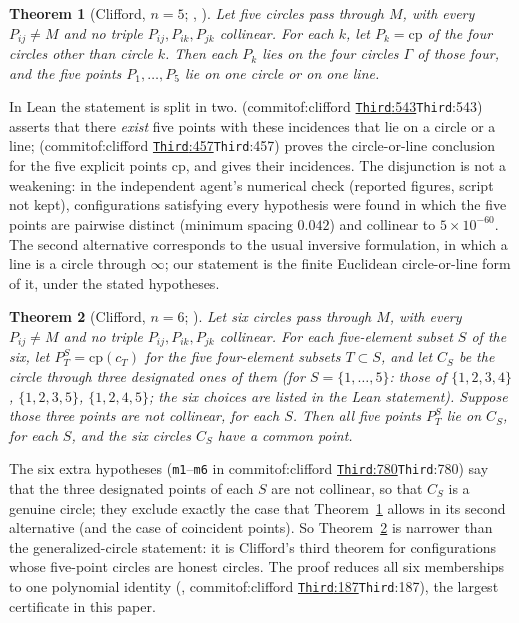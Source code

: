 \documentclass[11pt]{article}
\newtheorem{theorem}{Theorem}
\theoremstyle{definition}
\theoremstyle{remark}
\newcommand{\lean}[1]{\texttt{#1}}
\newcommand{\commitof}[1]{\csname commitof:#1\endcsname}
\newcommand{\repo}[1]{https://github.com/jpbald93/#1}
\newcommand{\src}[4]{\ifcsname commitof:#1\endcsname
  \href{\repo{#1}/blob/\commitof{#1}/#2/#3.lean\#L#4}{\texttt{#3}:#4}\else\texttt{#3}:#4\fi}
\begin{document}
\begin{theorem}[Clifford, $n=5$; , ]\label{thm:cliff5}
Let five circles pass through $M$, with every $P_{ij}\neq M$ and no triple $P_{ij},P_{ik},P_{jk}$
collinear. For each $k$, let $P_k=\mathrm{cp}$ of the four circles other than circle $k$. Then each
$P_k$ lies on the four circles $\Gamma$ of those four, and the five points $P_1,\dots,P_5$ lie on one
circle or on one line.
\end{theorem}

In Lean the statement is split in two.  (\src{clifford}{Clifford}{Third}{543})
asserts that there \emph{exist} five points with these incidences that lie on a circle or a line;
 (\src{clifford}{Clifford}{Third}{457}) proves the circle-or-line
conclusion for the five explicit points $\mathrm{cp}$, and  gives
their incidences. The disjunction is not a weakening: in the independent agent's numerical check (reported figures, script not kept), configurations
satisfying every hypothesis were found in which the five points are pairwise distinct (minimum spacing
$0.042$) and collinear to $5\times10^{-60}$. The second alternative corresponds to the usual inversive
formulation, in which a line is a circle through $\infty$; our statement is the finite Euclidean
circle-or-line form of it, under the stated hypotheses.

\begin{theorem}[Clifford, $n=6$; ]\label{thm:cliff6}
Let six circles pass through $M$, with every $P_{ij}\neq M$ and no triple $P_{ij},P_{ik},P_{jk}$
collinear. For each five-element subset $S$ of the six, let $P^S_T=\mathrm{cp}(c_T)$ for the five
four-element subsets $T\subset S$, and let $C_S$ be the circle through three designated ones of them
(for $S=\{1,\dots,5\}$: those of $\{1,2,3,4\}$, $\{1,2,3,5\}$, $\{1,2,4,5\}$; the six choices are listed
in the Lean statement). Suppose those three points are not collinear, for each $S$. Then all five
points $P^S_T$ lie on $C_S$, for each $S$, and the six circles $C_S$ have a common point.
\end{theorem}

The six extra hypotheses (\lean{m1}--\lean{m6} in \src{clifford}{Clifford}{Third}{780}) say that the
three designated points of each $S$ are not collinear, so that $C_S$ is a genuine circle; they exclude
exactly the case that Theorem~\ref{thm:cliff5} allows in its second alternative (and the case of
coincident points). So Theorem~\ref{thm:cliff6} is narrower than the
generalized-circle statement: it is Clifford's third theorem for configurations whose five-point
circles are honest circles. The proof reduces all six memberships to one polynomial identity
(, \src{clifford}{Clifford}{Third}{187}), the largest certificate in this paper.
\end{document}
